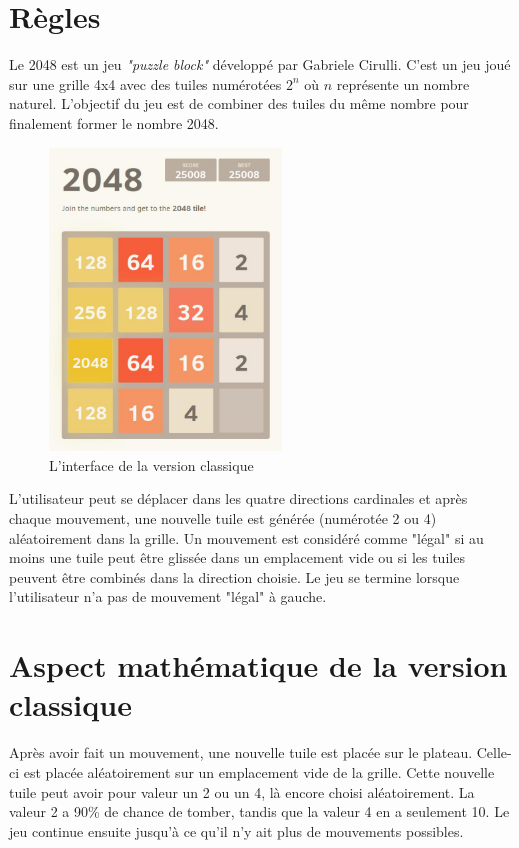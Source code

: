 \documentclass[a4paper, 12pt]{report}
\begin{document}
\section{Règles}

\tabto{1cm}Le 2048 est un jeu \textit{"puzzle block"} développé par Gabriele Cirulli. C'est un jeu joué sur
une grille 4x4 avec des tuiles numérotées ${2^{n}}$ où ${n}$ représente un nombre naturel. L'objectif
du jeu est de combiner des tuiles du même nombre pour finalement former le nombre 2048.

\begin{figure}[!t]
\centering
\includegraphics[width=0.55\textwidth]{../images/2048-classic-version.jpg}
\caption{L'interface de la version classique}
\label{Classic version}
\end{figure}

\vspace{0.5cm}

\tabto{1cm}L'utilisateur peut se déplacer dans les quatre directions cardinales et après chaque mouvement,
une nouvelle tuile est générée (numérotée 2 ou 4) aléatoirement dans la grille. Un mouvement est
considéré comme "légal" si au moins une tuile peut être glissée dans un emplacement vide ou si les tuiles
peuvent être combinés dans la direction choisie. Le jeu se termine lorsque l'utilisateur n'a pas de mouvement
"légal" à gauche.

\section{Aspect mathématique de la version classique}

\tabto{1cm}Après avoir fait un mouvement, une nouvelle tuile est placée sur le plateau.
Celle-ci est placée aléatoirement sur un emplacement vide de la grille. Cette nouvelle tuile
peut avoir pour valeur un 2 ou un 4, là encore choisi aléatoirement. La valeur 2 a 90\% de chance
de tomber, tandis que la valeur 4 en a seulement 10. Le jeu continue ensuite jusqu'à ce qu'il n'y
ait plus de mouvements possibles.
\end{document}

